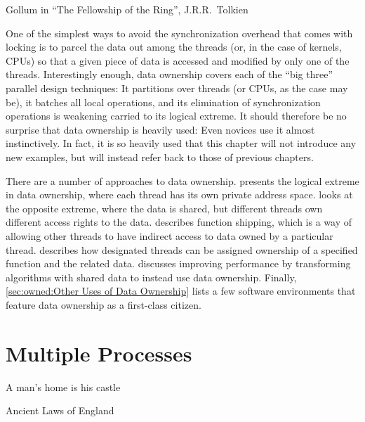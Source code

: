 
%
	 {Gollum in ``The Fellowship of the Ring'', J.R.R.~Tolkien}

One of the simplest ways to avoid the synchronization overhead that
comes with locking is to parcel the data out among the threads (or,
in the case of kernels, CPUs)
so that a given piece of data is accessed and modified by only one
of the threads.
Interestingly enough, data ownership covers each of the ``big three''
parallel design techniques:
It partitions over threads (or CPUs, as the case may be),
it batches all local operations,
and its elimination of synchronization operations is weakening
carried to its logical extreme.
It should therefore be no surprise that data ownership is heavily used:
Even novices use it almost instinctively.
In fact, it is so heavily used that this chapter will not introduce any
new examples, but will instead refer back to those of previous chapters.

\QuickQuizEnd

There are a number of approaches to data ownership.
 presents the logical extreme
in data ownership, where each thread has its own private address space.
 looks at
the opposite extreme, where the data is shared, but different threads
own different access rights to the data.
 describes function shipping,
which is a way of allowing other threads to have indirect access to
data owned by a particular thread.
 describes how designated
threads can be assigned ownership of a specified function and the
related data.
 discusses improving performance
by transforming algorithms with shared data to instead use data ownership.
Finally, \cref{sec:owned:Other Uses of Data Ownership} lists
a few software environments that feature data ownership as a
first-class citizen.

\section{Multiple Processes}
\label{sec:owned:Multiple Processes}
%
\epigraph{A man's home is his castle}{Ancient Laws of England}

